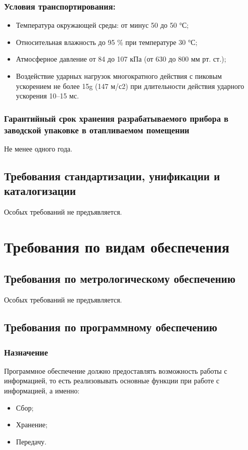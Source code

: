 			\subsubsection{Условия транспортирования:}
				\begin{itemize}
				\changefontsizes[14pt]{14pt}
					\item Температура окружающей среды: от минус 50 до 50 °С;
					\item Относительная влажность до 95 \% при температуре 30 °С;
					\item Атмосферное давление от 84 до 107 кПа (от 630 до 800 мм рт. ст.);
					\item Воздействие ударных нагрузок многократного действия с пиковым ускорением не более 15g (147 м/с2) при длительности действия ударного ускорения 10–15 мс.
				\end{itemize}
				\subsubsection{Гарантийный срок хранения разрабатываемого прибора в заводской упаковке в отапливаемом помещении}
					Не менее одного года.
		\subsection{Требования стандартизации, унификации и каталогизации}
			Особых требований не предъявляется.
	\section{Требования по видам обеспечения}
		\subsection{Требования по метрологическому обеспечению}
			Особых требований не предъявляется.
		\subsection{Требования по программному обеспечению}
			\subsubsection{Назначение}
				Программное обеспечение должно предоставлять возможность работы с информацией,
					то есть реализовывать основные функции при работе с информацией, а именно:
				\begin{itemize}
				\changefontsizes[14pt]{14pt}
					\item Сбор;
					\item Хранение;
					\item Передачу.
				\end{itemize}
